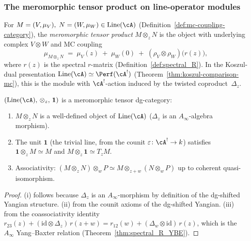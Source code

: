 \subsubsection{The meromorphic tensor product on line-operator modules}

\begin{definition}
\label{def:meromorphic-tensor-modules}
For $M = (V, \mu_V),\; N = (W, \mu_W)
\in \operatorname{Line}(\cA)$
(Definition~\ref{def:mc-coupling-category}),
the \emph{meromorphic tensor product} $M \otimes_z N$ is the
object with underlying complex $V \otimes W$ and MC coupling
\begin{equation}\label{eq:meromorphic-tensor-mc}
 \mu_{M \otimes_z N}
 \;=\;
 \mu_V(z) \;+\; \mu_W(0)
 \;+\; (\rho_V \otimes \rho_W)\bigl(r(z)\bigr),
\end{equation}
where $r(z)$ is the spectral $r$-matrix
(Definition~\ref{def:spectral_R}).
In the Koszul-dual presentation
$\operatorname{Line}(\cA) \simeq \Perf(\cA^!)$
(Theorem~\ref{thm:koszul-comparison-mc}),
this is the module with $\cA^!$-action induced by the twisted
coproduct~$\Delta_z$.
\end{definition}

\begin{theorem}
\label{thm:meromorphic-tensor-dgcat}
$(\operatorname{Line}(\cA),\, \otimes_z,\, \mathbf{1})$ is a
meromorphic tensor dg-category:
\begin{enumerate}[label=\textup{(\roman*)}]
\item $M \otimes_z N$ is a well-defined object of
 $\operatorname{Line}(\cA)$
 \textup{(}$\Delta_z$ is an $A_\infty$-algebra morphism\textup{)}.
\item The unit $\mathbf{1}$ \textup{(}the trivial line, from the
 counit $\varepsilon \colon \cA^! \to k$\textup{)} satisfies
 $\mathbf{1} \otimes_z M \simeq M$ and
 $M \otimes_z \mathbf{1} \simeq T_z M$.
\item Associativity:
 $(M \otimes_z N) \otimes_w P
 \simeq M \otimes_{z+w} (N \otimes_w P)$
 up to coherent quasi-isomorphism.
\end{enumerate}
\end{theorem}

\begin{proof}
(i) follows because $\Delta_z$ is an $A_\infty$-morphism by
definition of the dg-shifted Yangian structure.
(ii) from the counit axioms of the dg-shifted Yangian.
(iii) from the coassociativity identity
$r_{23}(z) + (\mathrm{id} \otimes \Delta_z)\, r(z+w)
= r_{12}(w) + (\Delta_w \otimes \mathrm{id})\, r(z)$,
which is the $A_\infty$ Yang--Baxter relation
(Theorem~\ref{thm:spectral_R_YBE}).
\end{proof}

